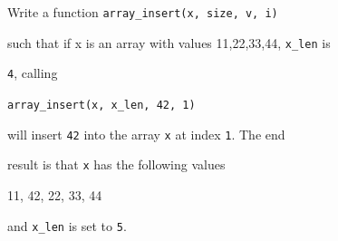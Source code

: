 Write a function \texttt{array\_insert(x, size, v, i)}

such that if x is an array with values {11,22,33,44}, \texttt{x\_len} is

\texttt{4}, calling



\texttt{array\_insert(x, x\_len, 42, 1)}



will insert \texttt{42} into the array \texttt{x} at index \texttt{1}. The end

result is that \texttt{x} has the following values



{11, 42, 22, 33, 44}



and \texttt{x\_len} is set to \texttt{5}.

